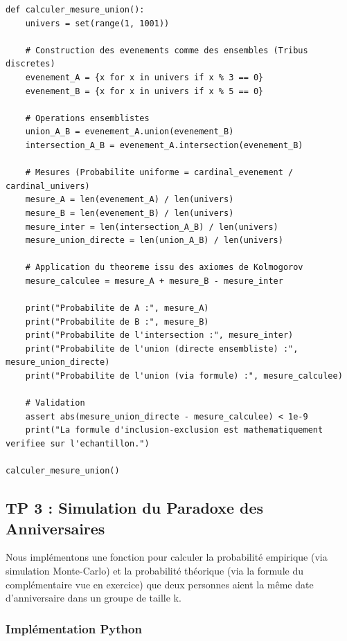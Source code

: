 \documentclass[11pt,a4paper]{article}
\begin{document}
\begin{lstlisting}
def calculer_mesure_union():
    univers = set(range(1, 1001))

    # Construction des evenements comme des ensembles (Tribus discretes)
    evenement_A = {x for x in univers if x % 3 == 0}
    evenement_B = {x for x in univers if x % 5 == 0}

    # Operations ensemblistes
    union_A_B = evenement_A.union(evenement_B)
    intersection_A_B = evenement_A.intersection(evenement_B)

    # Mesures (Probabilite uniforme = cardinal_evenement / cardinal_univers)
    mesure_A = len(evenement_A) / len(univers)
    mesure_B = len(evenement_B) / len(univers)
    mesure_inter = len(intersection_A_B) / len(univers)
    mesure_union_directe = len(union_A_B) / len(univers)

    # Application du theoreme issu des axiomes de Kolmogorov
    mesure_calculee = mesure_A + mesure_B - mesure_inter

    print("Probabilite de A :", mesure_A)
    print("Probabilite de B :", mesure_B)
    print("Probabilite de l'intersection :", mesure_inter)
    print("Probabilite de l'union (directe ensembliste) :", mesure_union_directe)
    print("Probabilite de l'union (via formule) :", mesure_calculee)

    # Validation
    assert abs(mesure_union_directe - mesure_calculee) < 1e-9
    print("La formule d'inclusion-exclusion est mathematiquement verifiee sur l'echantillon.")

calculer_mesure_union()
\end{lstlisting}



\subsection*{TP 3 : Simulation du Paradoxe des Anniversaires}

Nous implémentons une fonction pour calculer la probabilité empirique (via simulation Monte-Carlo) et la probabilité théorique (via la formule du complémentaire vue en exercice) que deux personnes aient la même date d'anniversaire dans un groupe de taille k.

\subsubsection*{Implémentation Python}
\end{document}
